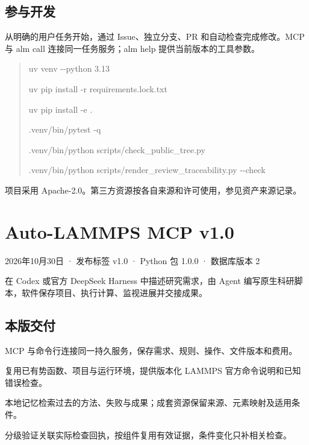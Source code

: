 \documentclass[11pt,a4paper]{ctexart}
\begin{document}
\subsection{参与开发}


从明确的用户任务开始，通过 Issue、独立分支、PR 和自动检查完成修改。MCP 与 alm call 连接同一任务服务；alm help 提供当前版本的工具参数。



\begin{quote}\small
uv venv -{}-python 3.13\par
uv pip install -r requirements.lock.txt\par
uv pip install -e .\par
.venv/\allowbreak{}bin/\allowbreak{}pytest -q\par
.venv/\allowbreak{}bin/\allowbreak{}python scripts/\allowbreak{}check\_\allowbreak{}public\_\allowbreak{}tree.py\par
.venv/\allowbreak{}bin/\allowbreak{}python scripts/\allowbreak{}render\_\allowbreak{}review\_\allowbreak{}traceability.py -{}-check\par
\end{quote}


项目采用 Apache-2.0。第三方资源按各自来源和许可使用，参见资产来源记录。

\clearpage
\section{Auto-LAMMPS MCP v1.0}


2026年10月30日 · 发布标签 v1.0 · Python 包 1.0.0 · 数据库版本 2



在 Codex 或官方 DeepSeek Harness 中描述研究需求，由 Agent 编写原生科研脚本，软件保存项目、执行计算、监视进展并交接成果。



\subsection{本版交付}


\noindent\textbullet\quad MCP 与命令行连接同一持久服务，保存需求、规则、操作、文件版本和费用。


\noindent\textbullet\quad 复用已有势函数、项目与运行环境，提供版本化 LAMMPS 官方命令说明和已知错误检查。


\noindent\textbullet\quad 本地记忆检索过去的方法、失败与成果；成套资源保留来源、元素映射及适用条件。


\noindent\textbullet\quad 分级验证关联实际检查回执，按组件复用有效证据，条件变化只补相关检查。
\end{document}
